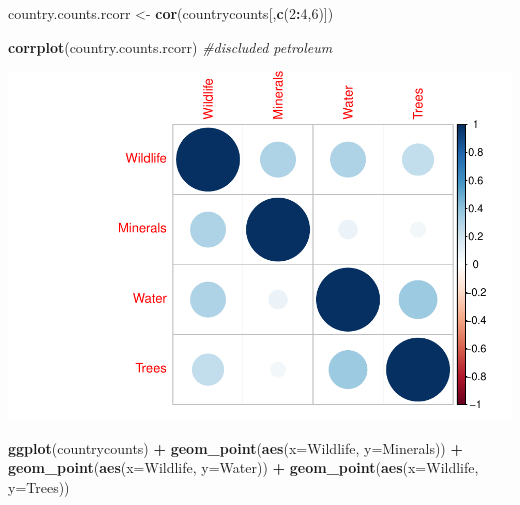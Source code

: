 \documentclass[
  12pt,
]{article}
\newenvironment{Shaded}{\begin{snugshade}}{\end{snugshade}}
\newcommand{\CommentTok}[1]{\textcolor[rgb]{0.56,0.35,0.01}{\textit{#1}}}
\newcommand{\DataTypeTok}[1]{\textcolor[rgb]{0.13,0.29,0.53}{#1}}
\newcommand{\DecValTok}[1]{\textcolor[rgb]{0.00,0.00,0.81}{#1}}
\newcommand{\KeywordTok}[1]{\textcolor[rgb]{0.13,0.29,0.53}{\textbf{#1}}}
\newcommand{\NormalTok}[1]{#1}
\newcommand{\OperatorTok}[1]{\textcolor[rgb]{0.81,0.36,0.00}{\textbf{#1}}}
\newcommand{\StringTok}[1]{\textcolor[rgb]{0.31,0.60,0.02}{#1}}
\begin{document}
\begin{Shaded}
\begin{Highlighting}[]
\NormalTok{country.counts.rcorr <-}\StringTok{ }\KeywordTok{cor}\NormalTok{(countrycounts[,}\KeywordTok{c}\NormalTok{(}\DecValTok{2}\OperatorTok{:}\DecValTok{4}\NormalTok{,}\DecValTok{6}\NormalTok{)])}

\KeywordTok{corrplot}\NormalTok{(country.counts.rcorr) }\CommentTok{#discluded petroleum}
\end{Highlighting}
\end{Shaded}

\includegraphics{FinalProject_Myers_files/figure-latex/unnamed-chunk-10-1.pdf}

\begin{Shaded}
\begin{Highlighting}[]
\KeywordTok{ggplot}\NormalTok{(countrycounts) }\OperatorTok{+}
\StringTok{  }\KeywordTok{geom_point}\NormalTok{(}\KeywordTok{aes}\NormalTok{(}\DataTypeTok{x=}\NormalTok{Wildlife, }\DataTypeTok{y=}\NormalTok{Minerals)) }\OperatorTok{+}
\StringTok{  }\KeywordTok{geom_point}\NormalTok{(}\KeywordTok{aes}\NormalTok{(}\DataTypeTok{x=}\NormalTok{Wildlife, }\DataTypeTok{y=}\NormalTok{Water)) }\OperatorTok{+}
\StringTok{  }\KeywordTok{geom_point}\NormalTok{(}\KeywordTok{aes}\NormalTok{(}\DataTypeTok{x=}\NormalTok{Wildlife, }\DataTypeTok{y=}\NormalTok{Trees))}
\end{Highlighting}
\end{Shaded}
\end{document}
